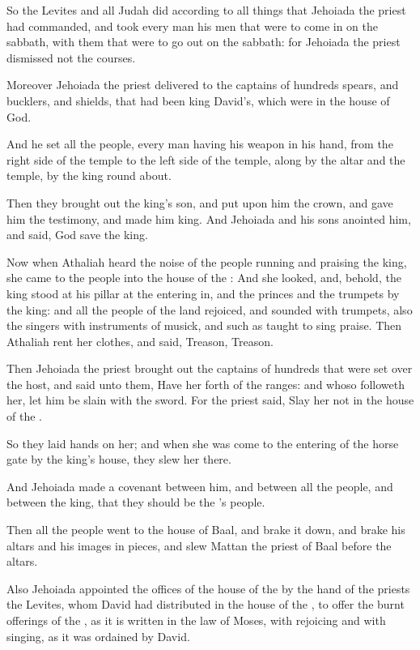 \verse So the Levites and all Judah did according to all things that Jehoiada the priest had commanded, and took every man his men that were to come in on the sabbath, with them that were to go out on the sabbath: for Jehoiada the priest dismissed not the courses.

\verse Moreover Jehoiada the priest delivered to the captains of hundreds spears, and bucklers, and shields, that had been king David's, which were in the house of God.

\verse And he set all the people, every man having his weapon in his hand, from the right side of the temple to the left side of the temple, along by the altar and the temple, by the king round about.

\verse Then they brought out the king's son, and put upon him the crown, and gave him the testimony, and made him king. And Jehoiada and his sons anointed him, and said, God save the king.

\verse Now when Athaliah heard the noise of the people running and praising the king, she came to the people into the house of the \LORD: \verse And she looked, and, behold, the king stood at his pillar at the entering in, and the princes and the trumpets by the king: and all the people of the land rejoiced, and sounded with trumpets, also the singers with instruments of musick, and such as taught to sing praise.  Then Athaliah rent her clothes, and said, Treason, Treason.

\verse Then Jehoiada the priest brought out the captains of hundreds that were set over the host, and said unto them, Have her forth of the ranges: and whoso followeth her, let him be slain with the sword. For the priest said, Slay her not in the house of the \LORD.

\verse So they laid hands on her; and when she was come to the entering of the horse gate by the king's house, they slew her there.

\verse And Jehoiada made a covenant between him, and between all the people, and between the king, that they should be the \LORD's people.

\verse Then all the people went to the house of Baal, and brake it down, and brake his altars and his images in pieces, and slew Mattan the priest of Baal before the altars.

\verse Also Jehoiada appointed the offices of the house of the \LORD by the hand of the priests the Levites, whom David had distributed in the house of the \LORD, to offer the burnt offerings of the \LORD, as it is written in the law of Moses, with rejoicing and with singing, as it was ordained by David.

